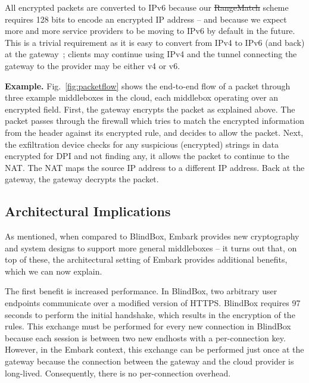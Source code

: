 \documentclass[letterpaper,twocolumn,10pt]{article}
\newcommand{\sys}{Embark\xspace} %
\providecommand{\DIFaddtex}[1]{{\protect\color{blue}\uwave{#1}}} %
\providecommand{\DIFdeltex}[1]{{\protect\color{red}\sout{#1}}}                      %
\providecommand{\DIFaddbegin}{} %
\providecommand{\DIFaddend}{} %
\providecommand{\DIFdelbegin}{} %
\providecommand{\DIFdelend}{} %
\providecommand{\DIFadd}[1]{\texorpdfstring{\DIFaddtex{#1}}{#1}} %
\providecommand{\DIFdel}[1]{\texorpdfstring{\DIFdeltex{#1}}{}} %
\begin{document}
All encrypted packets are converted to IPv6 because our \DIFdelbegin \DIFdel{RangeMatch }\DIFdelend \DIFaddbegin \DIFadd{PrefixMatch }\DIFaddend scheme requires 128 bits to encode an encrypted IP address  -- and because we expect more and more service providers to be moving to IPv6 by default in the future.
This is a trivial requirement as it is easy to convert from IPv4 to IPv6 (and back) at the gateway~\cite{siit}; clients may continue using IPv4 and the tunnel connecting the gateway to the provider may be either v4 or v6.

{\bf Example.} Fig.~\ref{fig:packetflow} shows the end-to-end flow of a packet through three example middleboxes in the cloud, each middlebox operating over an encrypted field.  
First,  the gateway encrypts the packet as explained above. The packet passes through the firewall which tries to match the encrypted information from the header against its encrypted rule, and decides to allow the packet. Next, the exfiltration device checks for any suspicious (encrypted) strings in data encrypted for DPI and not finding any, it allows the packet to continue to the NAT. The NAT maps the source IP address to a different IP address. Back at the gateway, the gateway decrypts the packet. 

\subsection{Architectural Implications} 
\label{sec:bbarch}

As mentioned, when compared to BlindBox, \sys provides new cryptography and system designs to support  more general middleboxes --  it turns out that, on top of these, the architectural setting of \sys provides additional benefits, which we can now explain.


%
The first benefit is increased performance. In BlindBox, two arbitrary user endpoints communicate over a modified version of HTTPS. BlindBox requires 97 seconds to perform the initial handshake, which results in the encryption of the rules. 
This exchange must be performed for every new connection in BlindBox because each session is between two new endhosts with a per-connection key.
However, in the \sys context, this exchange can be performed just once at the gateway because the connection between the gateway and the cloud provider is long-lived. Consequently, there is no per-connection overhead. 
\end{document}
